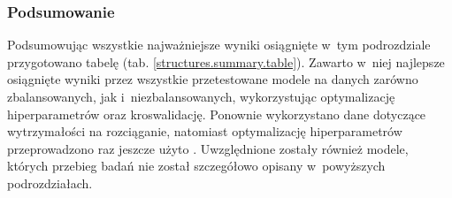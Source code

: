 \subsubsection{Podsumowanie}
\label{structures.summary}

Podsumowując wszystkie najważniejsze wyniki osiągnięte w~tym podrozdziale przygotowano tabelę (tab. \ref{structures.summary.table}). Zawarto w~niej najlepsze osiągnięte wyniki przez wszystkie przetestowane modele na danych zarówno zbalansowanych, jak i~niezbalansowanych, wykorzystując optymalizację hiperparametrów oraz kroswalidację. Ponownie wykorzystano dane dotyczące wytrzymałości na rozciąganie, natomiast optymalizację hiperparametrów przeprowadzono raz jeszcze użyto  . Uwzględnione zostały również modele, których przebieg badań nie został szczegółowo opisany w~powyższych podrozdziałach. 
